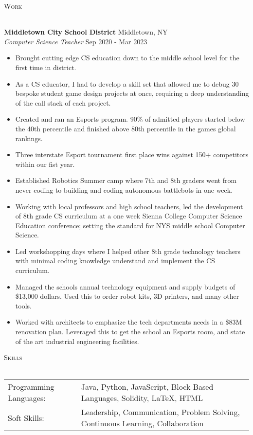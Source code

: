 \documentclass[a4paper]{article}
\newcommand{\lineunder} {
    \vspace*{-8pt} \\
    \hspace*{-18pt} \hrulefill \\
}
\newcommand{\header} [1] {
    {\hspace*{-18pt}\vspace*{6pt} \textsc{#1}}
    \vspace*{-6pt} \lineunder
}
\begin{document}
\header{Work}
\vspace{1mm}

\textbf{Middletown City School District} \hfill Middletown, NY\\
\textit{Computer Science Teacher} \hfill Sep 2020 - Mar 2023\\
\vspace{-1mm}
\begin{itemize} \itemsep 1pt
	\item Brought cutting edge CS education down to the middle school level for the first time in district.
    \item As a CS educator, I had to develop a skill set that allowed me to debug 30 bespoke student game design projects at once, requiring a deep understanding of the call stack of each project.
	\item Created and ran an Esports program. 90\% of admitted players started below the 40th percentile and finished above 80th percentile in the games\textquotesingle{} global rankings.
	\item Three interstate Esport tournament first place wins against 150+ competitors within our fist year.
	\item Established Robotics Summer camp where 7th and 8th graders went from never coding to building and coding autonomous battlebots in one week.
	\item Working with local professors and high school teachers, led the development of 8th grade CS curriculum at a one week Sienna College Computer Science Education conference; setting the standard for NYS middle school Computer Science.
	\item Led workshopping days where I helped other 8th grade technology teachers with minimal coding knowledge understand and implement the CS curriculum.
	\item Managed the schools annual technology equipment and supply budgets of \$13,000 dollars. Used this to order robot kits, 3D printers, and many other tools.
	\item Worked with architects to emphasize the tech departments needs in a \$83M renovation plan. Leveraged this to get the school an Esports room, and state of the art industrial engineering facilities.
\end{itemize}

\header{Skills}
\begin{tabular}{ l l }
	Programming Languages: & Java, Python, JavaScript, Block Based Languages, Solidity, LaTeX, HTML        \\
	Soft Skills:           & Leadership, Communication, Problem Solving, Continuous Learning, Collaboration \\
\end{tabular}
\vspace{2mm}
\end{document}
